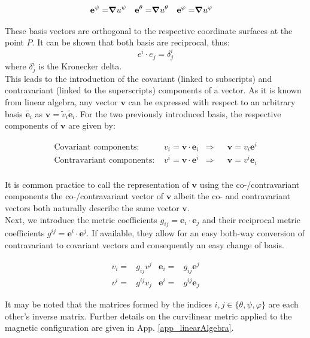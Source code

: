 \begin{align}
	\mathbf{e}^\psi = & \grad{u^\psi} & \mathbf{e}^\theta = & \grad{u^\theta} & \mathbf{e}^\varphi = & \grad{u^\varphi}
\end{align}

These basis vectors are orthogonal to the respective coordinate surfaces at the point $P$. It can be shown that both basis are reciprocal, thus:
$$ e^i\cdot e_j = \delta^i_j $$
where $\delta^i_j$ is the Kronecker delta. \\
This leads to the introduction of the covariant (linked to subscripts) and contravariant (linked to the superscripts) components of a vector. As it is known from linear algebra, any vector $\mathbf{v}$ can be expressed with respect to an arbitrary basis $\tilde{\mathbf{e}_i}$ as $\mathbf{v}=\tilde{v}_i\tilde{\mathbf{e}}_i$. For the two previously introduced basis, the respective components of $\mathbf{v}$ are given by: 

\begin{align}
	\text{Covariant components: }    & v_i = \mathbf{v}\cdot\mathbf{e}_i & \Rightarrow && \mathbf{v} = v_i\mathbf{e}^i \\
	\text{Contravariant components: }& v^i = \mathbf{v}\cdot\mathbf{e}^i & \Rightarrow && \mathbf{v} = v^i\mathbf{e}_i \\
\end{align}

It is common practice to call the representation of $\mathbf{v}$ using the co-/contravariant components the co-/contravariant vector of $\mathbf{v}$ albeit the co- and contravariant vectors both naturally describe the same vector $\mathbf{v}$. \\
Next, we introduce the metric coefficients $g_{ij} = \mathbf{e}_i\cdot \mathbf{e}_j$ and their reciprocal metric coefficients $g^{ij} = \mathbf{e}^i\cdot \mathbf{e}^j$. If available, they allow for an easy both-way conversion of contravariant to covariant vectors and consequently an easy change of basis. 

\begin{align}
	v_i =& g_{ij}v^j & \mathbf{e}_i =& g_{ij}\mathbf{e}^j \\
	v^i =& g^{ij}v_j & \mathbf{e}^i =& g^{ij}\mathbf{e}_j 
\end{align}

It may be noted that the matrices formed by the indices $i,j\in\{\theta,\psi,\varphi\}$ are each other's inverse matrix. Further details on the curvilinear metric applied to the magnetic configuration are given in App. \ref{app_linearAlgebra}. \\



